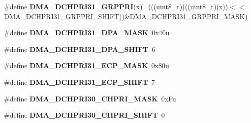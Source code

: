 \begin{DoxyCompactItemize}
\item 
\hypertarget{group___d_m_a___register___masks_gabc3515b7fb18623a1aa2d08c08cc5f36}{}\#define {\bfseries D\+M\+A\+\_\+\+D\+C\+H\+P\+R\+I31\+\_\+\+G\+R\+P\+P\+R\+I}(x)                                  ~(((uint8\+\_\+t)(((uint8\+\_\+t)(x))$<$$<$D\+M\+A\+\_\+\+D\+C\+H\+P\+R\+I31\+\_\+\+G\+R\+P\+P\+R\+I\+\_\+\+S\+H\+I\+F\+T))\&D\+M\+A\+\_\+\+D\+C\+H\+P\+R\+I31\+\_\+\+G\+R\+P\+P\+R\+I\+\_\+\+M\+A\+S\+K)\label{group___d_m_a___register___masks_gabc3515b7fb18623a1aa2d08c08cc5f36}

\item 
\hypertarget{group___d_m_a___register___masks_gaa7d3b8c13ff41cdcea7fa2a69d88e461}{}\#define {\bfseries D\+M\+A\+\_\+\+D\+C\+H\+P\+R\+I31\+\_\+\+D\+P\+A\+\_\+\+M\+A\+S\+K}~0x40u\label{group___d_m_a___register___masks_gaa7d3b8c13ff41cdcea7fa2a69d88e461}

\item 
\hypertarget{group___d_m_a___register___masks_ga053dfb1fc4fe18251a7998cc43a2bf14}{}\#define {\bfseries D\+M\+A\+\_\+\+D\+C\+H\+P\+R\+I31\+\_\+\+D\+P\+A\+\_\+\+S\+H\+I\+F\+T}~6\label{group___d_m_a___register___masks_ga053dfb1fc4fe18251a7998cc43a2bf14}

\item 
\hypertarget{group___d_m_a___register___masks_gae9c6c09abec22296be96c61e2d5e1183}{}\#define {\bfseries D\+M\+A\+\_\+\+D\+C\+H\+P\+R\+I31\+\_\+\+E\+C\+P\+\_\+\+M\+A\+S\+K}~0x80u\label{group___d_m_a___register___masks_gae9c6c09abec22296be96c61e2d5e1183}

\item 
\hypertarget{group___d_m_a___register___masks_gac6038aaca00ea7d75fdbbd053a0055ac}{}\#define {\bfseries D\+M\+A\+\_\+\+D\+C\+H\+P\+R\+I31\+\_\+\+E\+C\+P\+\_\+\+S\+H\+I\+F\+T}~7\label{group___d_m_a___register___masks_gac6038aaca00ea7d75fdbbd053a0055ac}

\item 
\hypertarget{group___d_m_a___register___masks_gac2e56dfb56e3249a3e380bc58a276090}{}\#define {\bfseries D\+M\+A\+\_\+\+D\+C\+H\+P\+R\+I30\+\_\+\+C\+H\+P\+R\+I\+\_\+\+M\+A\+S\+K}~0x\+Fu\label{group___d_m_a___register___masks_gac2e56dfb56e3249a3e380bc58a276090}

\item 
\hypertarget{group___d_m_a___register___masks_ga339c2f309f6957aa285dd7ce63143cbc}{}\#define {\bfseries D\+M\+A\+\_\+\+D\+C\+H\+P\+R\+I30\+\_\+\+C\+H\+P\+R\+I\+\_\+\+S\+H\+I\+F\+T}~0\label{group___d_m_a___register___masks_ga339c2f309f6957aa285dd7ce63143cbc}


\end{DoxyCompactItemize}
